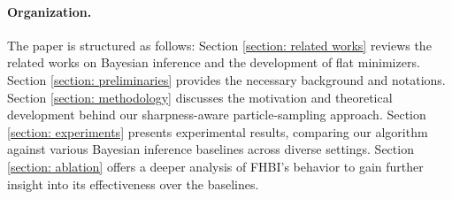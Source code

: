 \paragraph{Organization.} The paper is structured as follows: Section \ref{section: related works} reviews the related works on Bayesian inference and the development of flat minimizers. Section \ref{section: preliminaries} provides the necessary background and notations. Section \ref{section: methodology} discusses the motivation and theoretical development behind our sharpness-aware particle-sampling approach. Section \ref{section: experiments} presents experimental results, comparing our algorithm against various Bayesian inference baselines across diverse settings. Section \ref{section: ablation} offers a deeper analysis of FHBI's behavior to gain further insight into its effectiveness over the baselines.



